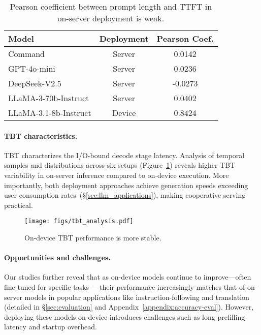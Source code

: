 \begin{table}[t]
    \centering
    \footnotesize
    \begin{tabularx}{\linewidth}{lcc}
    \toprule
    \textbf{Model} & \textbf{Deployment} & \textbf{Pearson Coef.} \\
    \midrule 
    Command & Server & 0.0142 \\
    GPT-4o-mini & Server & 0.0236 \\
    DeepSeek-V2.5 & Server & -0.0273 \\
    LLaMA-3-70b-Instruct & Server & 0.0402 \\
    \hline
    LLaMA-3.1-8b-Instruct & Device & 0.8424 \\
    \bottomrule
    \end{tabularx}
    \caption{Pearson coefficient between prompt length and TTFT in on-server deployment is weak.}
    \vskip -0.1in
    \label{tab:correlation-analysis}
\end{table}

\paragraph{TBT characteristics.}
TBT characterizes the I/O-bound decode stage latency. Analysis of temporal samples and distributions across six setups (Figure~\ref{fig:tbt_analysis}) reveals higher TBT variability in on-server inference compared to on-device execution. More importantly, both deployment approaches achieve generation speeds exceeding user consumption rates~(\S \ref{sec:llm_applications}), making cooperative serving practical.

\begin{figure}[t]
    \centering
    \texttt{[image: figs/tbt\_analysis.pdf]}
    \vskip -0.1in
    \caption{On-device TBT performance is more stable. \footnotemark[1]{}
    }
    \vskip -0.1in
    \label{fig:tbt_analysis}
\end{figure}


\paragraph{Opportunities and challenges.}
Our studies further reveal that as on-device models continue to improve---often fine-tuned for specific tasks~\citep{appleintelligence,liu2024mobilellm}---their performance increasingly matches that of on-server models in popular applications like instruction-following and translation (detailed in \S\ref{sec:evaluation} and Appendix~\ref{appendix:accuracy-eval}). However, deploying these models on-device introduces challenges such as long prefilling latency and startup overhead.

